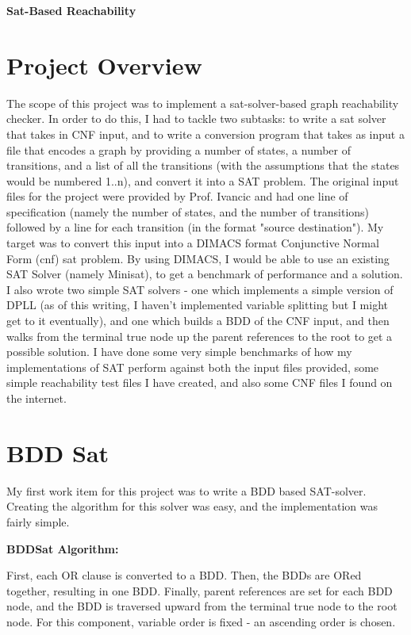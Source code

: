 \documentclass[11pt]{article}
\begin{document}
\begin{center}
\huge{\bf{Sat-Based Reachability}}
\end{center}
\begin{flushleft}
\section{Project Overview} The scope of this project was to implement a sat-solver-based graph reachability checker. In order to do this, I had to tackle two subtasks: to write a sat solver that takes in CNF input, and to write a conversion program that takes as input a file that encodes a graph by providing a number of states, a number of transitions, and a list of all the transitions (with the assumptions that the states would be numbered 1..n), and convert it into a SAT problem. The original input files for the project were provided by Prof. Ivancic and had one line of specification (namely the number of states, and the number of transitions) followed by a line for each transition (in the format "source destination"). My target was to convert this input into a DIMACS format Conjunctive Normal Form (cnf) sat problem. By using DIMACS, I would be able to use an existing SAT Solver (namely Minisat), to get a benchmark of performance and a solution. I also wrote two simple SAT solvers - one which  implements a simple version of DPLL (as of this writing, I haven't implemented variable splitting but I might get to it eventually), and one which builds a BDD of the CNF input, and then walks from the terminal true node up the parent references to the root to get a possible solution. I have done some very simple benchmarks of how my implementations of SAT perform against both the input files provided, some simple reachability test files I have created, and also some CNF files I found on the internet.
\section{BDD Sat}
My first work item for this project was to write a BDD based SAT-solver. Creating the algorithm for this solver was easy, and the implementation was fairly simple.\bigskip

{\bf{BDDSat Algorithm:}}\medskip

First, each OR clause is converted to a BDD. Then, the BDDs are ORed together, resulting in one BDD. Finally,  parent references are set for each BDD node, and the BDD is traversed upward from the terminal true node to the root node. For this component, variable order is fixed - an ascending order is chosen.


\end{flushleft}
\end{document}
